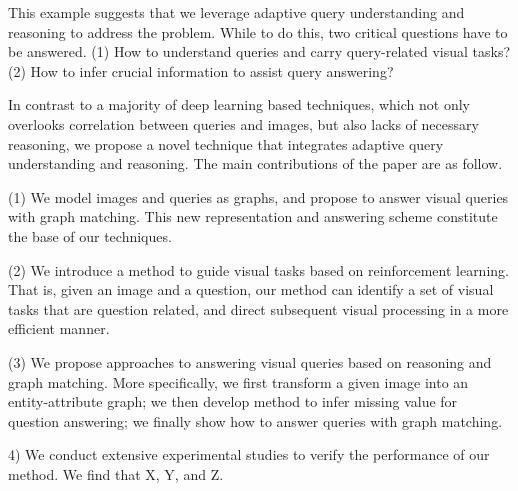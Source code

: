 This example suggests that we leverage adaptive query understanding and reasoning to address the \vqa problem. While to do this, two critical questions have to be answered. (1) How to understand queries and carry query-related visual tasks? (2) How to infer crucial information to assist query answering?  


\vspace{2ex}
 In contrast to a majority of deep learning based \vqa techniques, which not only overlooks correlation between queries and images, but also lacks of necessary reasoning, we propose a novel technique that integrates adaptive query understanding and reasoning.  The main contributions of the paper are as follow.  

(1) We model images and queries as graphs, and propose to answer visual queries with graph matching. This new representation and answering scheme constitute the base of our techniques.  

(2) We introduce a method to guide visual tasks based on reinforcement learning. That is, given an image and a question, our method can identify a set of visual tasks that are question related, and direct subsequent visual processing in a more efficient manner. 

(3) We propose approaches to answering visual queries based on reasoning and graph matching. More specifically, we first transform a given image into an entity-attribute graph; we then develop method to infer missing value for question answering; %
we finally show how to answer queries with graph matching. %

4) We conduct extensive experimental studies to verify the performance of our method. We find that X, Y, and Z. 